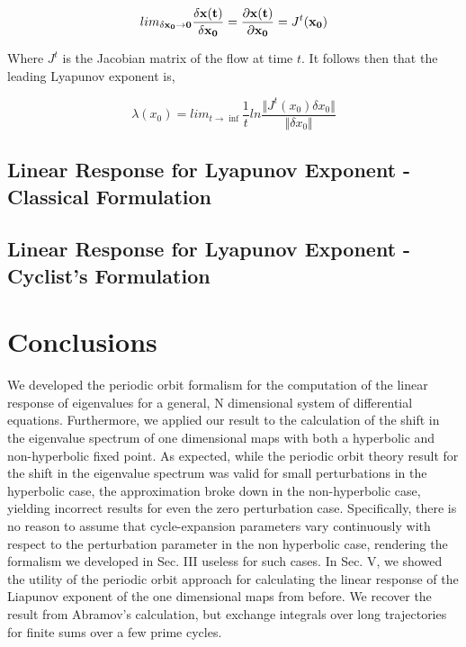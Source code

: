 \documentclass[pre,aps,twocolumn,showpacs,hyperref]{revtex4-1} %
\begin{document}
\begin{equation}
lim_{\bf \delta x_{0} \rightarrow 0} \frac{\bf \delta x(t)}{\bf \delta x_{0}} = \frac{\bf \partial x(t)}{\bf \partial x_{0}} = J^{t}(\bf x_{0})
\end{equation}

Where $J^{t}$ is the Jacobian matrix of the flow at time $t$. It follows then that the leading Lyapunov exponent is,

\begin{equation}
\lambda(\textbf{$x_{0}$}) = lim_{t\rightarrow \inf}\frac{1}{t} ln \frac{\Vert J^{t}(\textbf{$x_{0}$}) \textbf{$\delta x_{0}$} \Vert}{\Vert \textbf{$\delta x_{0}$} \Vert}
\end{equation}

\subsection{Linear Response for Lyapunov Exponent - Classical Formulation}

\subsection{Linear Response for Lyapunov Exponent - Cyclist's Formulation}
\section{Conclusions}
We developed the periodic orbit formalism for the computation of the linear response of eigenvalues for a general, N dimensional system of differential equations. Furthermore, we applied our result to the calculation of the shift in the eigenvalue spectrum of one dimensional maps with both a hyperbolic and non-hyperbolic fixed point. As expected, while the periodic orbit theory result for the shift in the eigenvalue spectrum was valid for small perturbations in the hyperbolic case, the approximation broke down in the non-hyperbolic case, yielding incorrect results for even the zero perturbation case. Specifically, there is no reason to assume that cycle-expansion parameters vary continuously with respect to the perturbation parameter in the non hyperbolic case, rendering the formalism we developed in Sec. III useless for such cases.
\indent In Sec. V, we showed the utility of the periodic orbit approach for calculating the linear response of the Liapunov exponent of the one dimensional maps from before. We recover the result from Abramov's calculation, but exchange integrals over long trajectories for finite sums over a few prime cycles.
\end{document}
